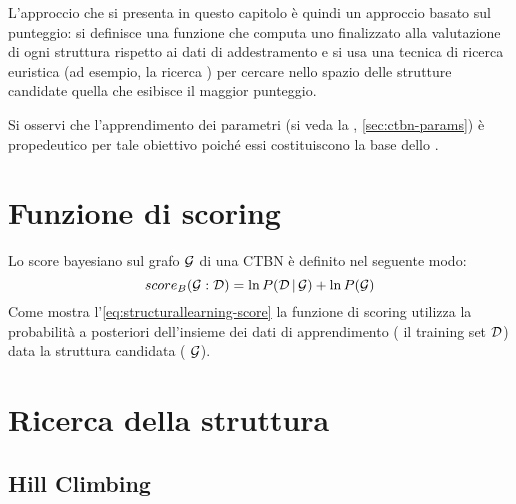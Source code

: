 L'approccio che si presenta in questo capitolo è quindi un approccio basato sul punteggio: si definisce una funzione che computa uno \emph{} finalizzato alla valutazione di ogni struttura rispetto ai dati di addestramento e si usa una tecnica di ricerca euristica (ad esempio, la ricerca \emph{}) per cercare nello spazio delle strutture candidate quella che esibisce il maggior punteggio.

Si osservi che l'apprendimento dei parametri (si veda la , \autoref{sec:ctbn-params}) è propedeutico per tale obiettivo poiché essi costituiscono la base dello .

\cleardoublepage
\section{Funzione di scoring}\label{sec:ctbn-structurallearning-score}
Lo score bayesiano sul grafo $\mathcal{G}$ di una \acs{CTBN} è definito nel seguente modo:
\begin{equation}\label{eq:structurallearning-score}
score_B(\mathcal{G}:\mathcal{D})=\ln{P(\mathcal{D}\,\arrowvert\,\mathcal{G})} + \ln{P(\mathcal{G})}
\end{equation}
Come mostra l'\autoref{eq:structurallearning-score} la funzione di scoring utilizza la probabilità a posteriori dell’insieme dei dati di apprendimento (\ie{} il training set $\mathcal{D}$) data la struttura candidata (\ie{} $\mathcal{G}$).


\section{Ricerca della struttura}\label{sec:structurallearning-search}
\omissis{}

\subsection{Hill Climbing}\label{sec:structurallearning-hc}
\omissis{}




